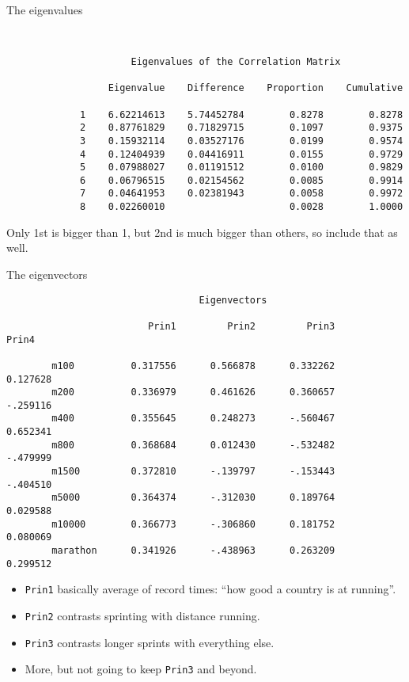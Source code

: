 \documentclass[pdf]{prosper}
\begin{document}
\begin{slide}{The eigenvalues}

{\scriptsize
\begin{verbatim}


                      Eigenvalues of the Correlation Matrix

                  Eigenvalue    Difference    Proportion    Cumulative

             1    6.62214613    5.74452784        0.8278        0.8278
             2    0.87761829    0.71829715        0.1097        0.9375
             3    0.15932114    0.03527176        0.0199        0.9574
             4    0.12404939    0.04416911        0.0155        0.9729
             5    0.07988027    0.01191512        0.0100        0.9829
             6    0.06796515    0.02154562        0.0085        0.9914
             7    0.04641953    0.02381943        0.0058        0.9972
             8    0.02260010                      0.0028        1.0000

\end{verbatim}
}

Only 1st is bigger than 1, but 2nd is much bigger than others, so include that as well.
  
\end{slide}

\begin{slide}{The eigenvectors}

{\scriptsize
\begin{verbatim}
                                  Eigenvectors

                         Prin1         Prin2         Prin3         Prin4

        m100          0.317556      0.566878      0.332262      0.127628
        m200          0.336979      0.461626      0.360657      -.259116
        m400          0.355645      0.248273      -.560467      0.652341
        m800          0.368684      0.012430      -.532482      -.479999
        m1500         0.372810      -.139797      -.153443      -.404510
        m5000         0.364374      -.312030      0.189764      0.029588
        m10000        0.366773      -.306860      0.181752      0.080069
        marathon      0.341926      -.438963      0.263209      0.299512

\end{verbatim}
}

\begin{itemize}
\item \verb-Prin1- basically average of record times: ``how good a country is at running''.
\item \verb-Prin2- contrasts sprinting with distance running.
\item \verb-Prin3- contrasts longer sprints with everything else.
\item More, but not going to keep \verb-Prin3- and beyond.
\end{itemize}
  
\end{slide}
\end{document}
